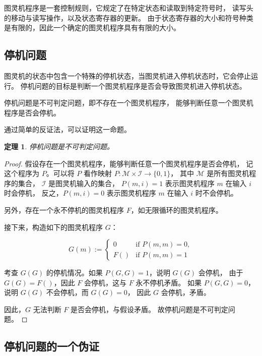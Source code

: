 \documentclass[twocolumn]{ctexart}
\newtheorem{theorem}{定理}
\begin{document}
图灵机程序是一套控制规则，它规定了在特定状态和读取到特定符号时，
读写头的移动与读写操作，以及状态寄存器的更新。
由于状态寄存器的大小和符号种类是有限的，因此一个确定的图灵机程序具有有限的大小。

\subsection{停机问题}

图灵机的状态中包含一个特殊的停机状态，当图灵机进入停机状态时，它会停止运行。
停机问题的目标是判断一个图灵机程序是否会导致图灵机进入停机状态。

停机问题是不可判定问题，即不存在一个图灵机程序，
能够判断任意一个图灵机程序是否会停机。

通过简单的反证法，可以证明这一命题。

\begin{theorem}\label{thm:turing-halting-undecidable}
    停机问题是不可判定问题。
\end{theorem}

\begin{proof}
    假设存在一个图灵机程序，能够判断任意一个图灵机程序是否会停机，
    记这个程序为 $P$。可以将 $P$ 看作映射 $P: \mathcal{M} \times \mathcal{I} \to \{0, 1\}$，
    其中 $\mathcal{M}$ 是所有图灵机程序的集合，
    $\mathcal{I}$ 是图灵机输入的集合，
    $P(m, i)=1$ 表示图灵机程序 $m$ 在输入 $i$ 时会停机，
    反之，$P(m, i)=0$ 表示图灵机程序 $m$ 在输入 $i$ 时不会停机。

    另外，存在一个永不停机的图灵机程序 $F$，如无限循环的图灵机程序。

    接下来，构造如下的图灵机程序 $G$：

    \begin{equation*}
        G(m) := \begin{cases}
            0   & \text{if } P(m, m)=0, \\
            F() & \text{if } P(m, m)=1
        \end{cases}
    \end{equation*}

    考查 $G(G)$ 的停机情况。如果 $P(G,G)=1$，说明 $G(G)$ 会停机，
    由于 $G(G)=F()$，因此 $F$ 会停机，这与 $F$ 永不停机矛盾。
    如果 $P(G,G)=0$，说明 $G(G)$ 不会停机，而 $G(G)=0$，
    因此 $G$ 会停机，矛盾。

    因此，$G$ 无法判断 $F$ 是否会停机，与假设矛盾。
    故停机问题是不可判定问题。
\end{proof}

\subsection{停机问题的一个伪证}
\end{document}
